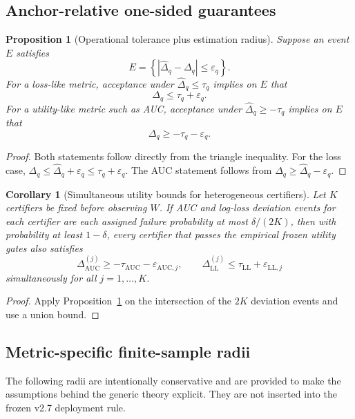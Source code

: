 \documentclass[10pt]{article}
\newcommand{\AUC}{\mathrm{AUC}}
\newcommand{\LL}{\mathrm{LL}}
\newtheorem{proposition}[theorem]{Proposition}
\newtheorem{corollary}[theorem]{Corollary}
\begin{document}
\subsection{Anchor-relative one-sided guarantees}

\begin{proposition}[Operational tolerance plus estimation radius]
\label{prop:tolerance}
Suppose an event $E$ satisfies
\[
E=\left\{ |\widehat\Delta_q-\Delta_q|\le \varepsilon_q\right\}.
\]
For a loss-like metric, acceptance under $\widehat\Delta_q\le \tau_q$ implies on $E$ that
\[
\Delta_q\le \tau_q+\varepsilon_q.
\]
For a utility-like metric such as AUC, acceptance under $\widehat\Delta_q\ge -\tau_q$ implies on $E$ that
\[
\Delta_q\ge -\tau_q-\varepsilon_q.
\]
\end{proposition}

\begin{proof}
Both statements follow directly from the triangle inequality. For the loss case, $\Delta_q\le \widehat\Delta_q+\varepsilon_q\le \tau_q+\varepsilon_q$. The AUC statement follows from $\Delta_q\ge \widehat\Delta_q-\varepsilon_q$.
\end{proof}

\begin{corollary}[Simultaneous utility bounds for heterogeneous certifiers]
\label{cor:multi}
Let $K$ certifiers be fixed before observing $W$. If AUC and log-loss deviation events for each certifier are each assigned failure probability at most $\delta/(2K)$, then with probability at least $1-\delta$, every certifier that passes the empirical frozen utility gates also satisfies
\[
\Delta^{(j)}_{\AUC}\ge -\tau_{\AUC}-\varepsilon_{\AUC,j},\qquad
\Delta^{(j)}_{\LL}\le \tau_{\LL}+\varepsilon_{\LL,j}
\]
simultaneously for all $j=1,\ldots,K$.
\end{corollary}

\begin{proof}
Apply Proposition~\ref{prop:tolerance} on the intersection of the $2K$ deviation events and use a union bound.
\end{proof}

\subsection{Metric-specific finite-sample radii}
The following radii are intentionally conservative and are provided to make the assumptions behind the generic theory explicit. They are not inserted into the frozen v2.7 deployment rule.
\end{document}
